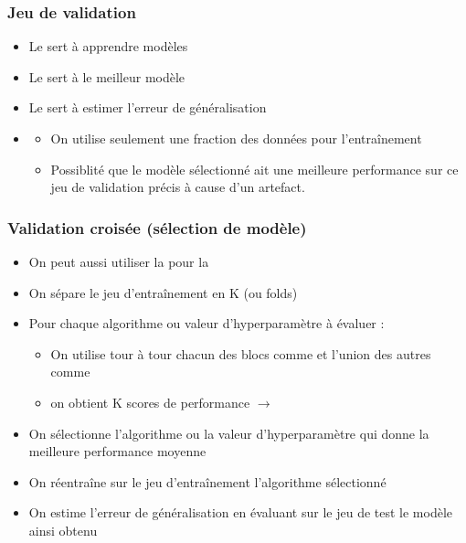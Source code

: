 \begin{frame}
  \frametitle{Jeu de validation}
  \begin{center}
  \end{center}
  \begin{itemize}
  \item Le  sert à apprendre  modèles
  \item Le  sert à  le meilleur modèle
  \item Le  sert à estimer l'erreur de généralisation 
  \pause
  \item {}
    \begin{itemize}
    \item On utilise seulement une fraction des données pour l'entraînement
    \item Possiblité que le modèle sélectionné ait une meilleure performance
      sur ce jeu de validation précis à cause d'un artefact.
    \end{itemize}
  \end{itemize}
\end{frame}

\begin{frame}
  \frametitle{Validation croisée (sélection de modèle)}
  \begin{itemize}
  \item On peut aussi utiliser la  pour la 
  \item On sépare le jeu d'entraînement en K  (ou folds)
  \item Pour chaque algorithme ou valeur d'hyperparamètre à évaluer :
    \begin{itemize}
    \item On utilise tour à tour chacun des blocs comme  et l'union des autres comme 
  \item[$\Rightarrow$] on obtient K scores de performance $\rightarrow$  
  \end{itemize}
\item On sélectionne l'algorithme ou la valeur d'hyperparamètre qui donne la meilleure performance moyenne
\item On réentraîne sur le jeu d'entraînement l'algorithme sélectionné
\item On estime l'erreur de généralisation en évaluant sur le jeu de test le modèle ainsi obtenu
  \end{itemize}
\end{frame}

